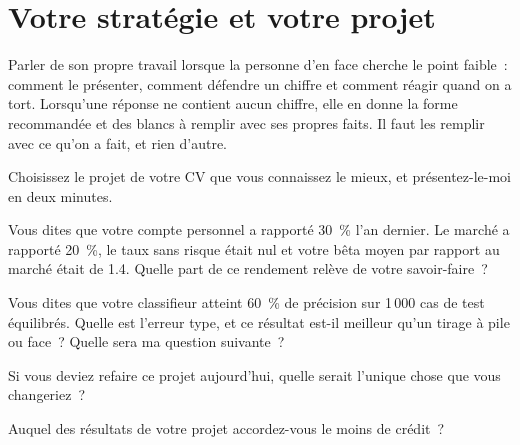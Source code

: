 \chapter{Votre stratégie et votre projet}\label{ch:iv2:your-strategy-and-your-project}

\begin{ivtrains}
Parler de son propre travail lorsque la personne d'en face cherche le point faible~: comment le présenter, comment défendre un chiffre et comment réagir quand on a tort. Lorsqu'une réponse ne contient aucun chiffre, elle en donne la forme recommandée et des blancs à remplir avec ses propres faits. Il faut les remplir avec ce qu'on a fait, et rien d'autre.
\end{ivtrains}

\begin{question}\label{iq:iv2:your-strategy-and-your-project:1}
Choisissez le projet de votre CV que vous connaissez le mieux, et présentez-le-moi en deux minutes.
\end{question}

\begin{question}\label{iq:iv2:your-strategy-and-your-project:2}
Vous dites que votre compte personnel a rapporté 30~\% l'an dernier. Le marché a rapporté 20~\%, le taux sans risque était nul et votre bêta moyen par rapport au marché était de 1.4. Quelle part de ce rendement relève de votre savoir-faire~?
\end{question}

\begin{question}\label{iq:iv2:your-strategy-and-your-project:3}
Vous dites que votre classifieur atteint 60~\% de précision sur 1\,000 cas de test équilibrés. Quelle est l'erreur type, et ce résultat est-il meilleur qu'un tirage à pile ou face~? Quelle sera ma question suivante~?
\end{question}

\begin{question}\label{iq:iv2:your-strategy-and-your-project:4}
Si vous deviez refaire ce projet aujourd'hui, quelle serait l'unique chose que vous changeriez~?
\end{question}

\begin{question}\label{iq:iv2:your-strategy-and-your-project:5}
Auquel des résultats de votre projet accordez-vous le moins de crédit~?
\end{question}

